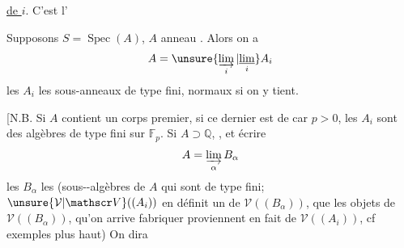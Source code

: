 \uline{de $i$}.  C'est l'

Supposons $S=\operatorname{Spec}(A)$, $A$ anneau   . Alors on a
\[
A=\unsure{\varinjlim_i|\underset{i}{\underline{\lim}}}A_i
\]
les $A_i$ les sous-anneaux de type fini,  normaux  si on y tient.

[N.B.  Si $A$ contient un corps premier, si ce dernier est de car $p>0$, les $A_i$ sont des algèbres de type fini sur $\mathbb F_p$. Si $A\supset\mathbb Q$,  , et écrire
\[
A=\varinjlim_\alpha B_\alpha
\]
les $B_\alpha$ les (sous--algèbres de $A$ qui sont de type fini;   $\unsure{\mathcal V|\mathscr V}((A_i))$ en définit un de $\mathcal V((B_\alpha))$,  que les objets  de $\mathcal V((B_\alpha))$, qu'on arrive  fabriquer proviennent en fait de $\mathcal V((A_i))$, cf exemples plus haut) On dira
